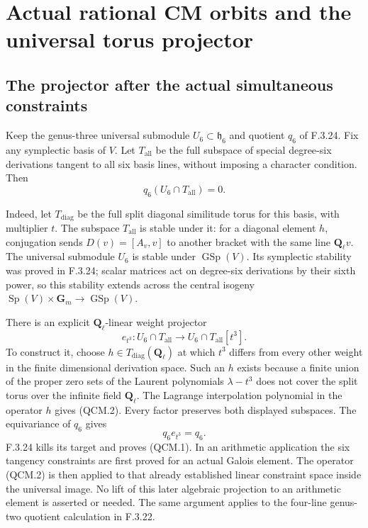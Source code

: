 \section*{Actual rational CM orbits and the universal torus projector}

\subsection*{The projector after the actual simultaneous constraints}
Keep the genus-three universal submodule $U_6\subset\mathfrak h_6$
and quotient $q_6$ of F.3.24. Fix any symplectic basis of $V$.
Let $T_{\mathrm{all}}$ be the full subspace of special degree-six
derivations tangent to all six basis lines, without imposing a
character condition. Then
\[
                         q_6(U_6\cap T_{\mathrm{all}})=0.       \tag{QCM.1}
\]

Indeed, let $T_{\mathrm{diag}}$ be the full split diagonal
similitude torus for this basis, with multiplier $t$. The
subspace $T_{\mathrm{all}}$ is stable under it: for a diagonal
element $h$, conjugation sends $D(v)=[A_v,v]$ to another
bracket with the same line $\mathbf Q_\ell v$. The universal
submodule $U_6$ is stable under $\operatorname{GSp}(V)$.
Its symplectic stability was proved in F.3.24; scalar matrices
act on degree-six derivations by their sixth power, so this
stability extends across the central isogeny
$\operatorname{Sp}(V)\times\mathbf G_m\to\operatorname{GSp}(V)$.

There is an explicit $\mathbf Q_\ell$-linear weight projector
\[
 e_{t^3}:U_6\cap T_{\mathrm{all}}
       \longrightarrow U_6\cap T_{\mathrm{all}}[t^3].          \tag{QCM.2}
\]
To construct it, choose $h\in T_{\mathrm{diag}}(\mathbf Q_\ell)$
at which $t^3$ differs from every other weight in the finite
dimensional derivation space. Such an $h$ exists because a
finite union of the proper zero sets of the Laurent
polynomials $\lambda-t^3$ does not cover the split torus
over the infinite field $\mathbf Q_\ell$. The Lagrange
interpolation polynomial in the operator $h$ gives (QCM.2).
Every factor preserves both displayed subspaces. The
equivariance of $q_6$ gives
\[
                              q_6 e_{t^3}=q_6.
\]
F.3.24 kills its target and proves (QCM.1).
In an arithmetic application the six tangency constraints
are first proved for an actual Galois element. The operator
(QCM.2) is then applied to that already established linear
constraint space inside the universal image. No lift of
this later algebraic projection to an arithmetic element
is asserted or needed. The same argument applies to the
four-line genus-two quotient calculation in F.3.22.

